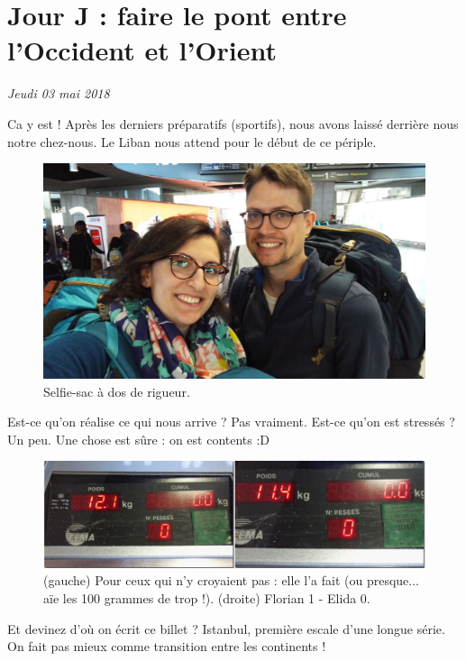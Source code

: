 \hypertarget{jour-j-faire-le-pont-entre-loccident-et-lorient}{%
\section{Jour J : faire le pont entre l'Occident et
l'Orient}\label{jour-j-faire-le-pont-entre-loccident-et-lorient}}

\emph{Jeudi 03 mai 2018}

Ca y est ! Après les derniers préparatifs (sportifs), nous avons laissé
derrière nous notre chez-nous. Le Liban nous attend pour le début de ce
périple.

\begin{figure}
\centering
\includegraphics{images/20180503_depart.jpg}
\caption{Selfie-sac à dos de rigueur.}
\end{figure}

Est-ce qu'on réalise ce qui nous arrive ? Pas vraiment. Est-ce qu'on est
stressés ? Un peu. Une chose est sûre : on est contents :D

\begin{figure}
\centering
\includegraphics{images/20180503_sacs.jpg}
\caption{(gauche) Pour ceux qui n'y croyaient pas : elle l'a fait (ou presque...
aïe les 100 grammes de trop !). (droite) Florian 1 - Elida 0.}
\end{figure}

Et devinez d'où on écrit ce billet ? Istanbul, première escale d'une
longue série. On fait pas mieux comme transition entre les continents !

